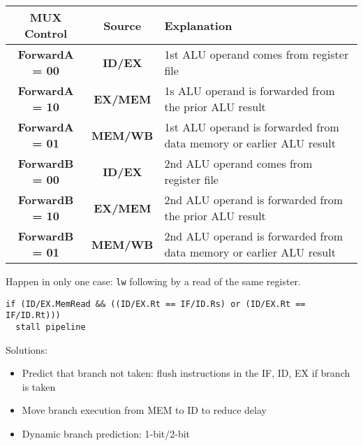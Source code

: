 \begin{multicols}{2}
\begin{tabular}{|c|c|p{8cm}|}
\hline
\textbf{MUX Control}   & \textbf{Source} & \textbf{Explanation}                                                \\ \hline
\textbf{ForwardA = 00} & \textbf{ID/EX}  & 1st ALU operand comes from register file                            \\ \hline
\textbf{ForwardA = 10} & \textbf{EX/MEM} & 1s ALU operand is forwarded from the prior ALU result               \\ \hline
\textbf{ForwardA = 01} & \textbf{MEM/WB} & 1st ALU operand is forwarded from data memory or earlier ALU result \\ \hline
\textbf{ForwardB = 00} & \textbf{ID/EX}  & 2nd ALU operand comes from register file                            \\ \hline
\textbf{ForwardB = 10} & \textbf{EX/MEM} & 2nd ALU operand is forwarded from the prior ALU result              \\ \hline
\textbf{ForwardB = 01} & \textbf{MEM/WB} & 2nd ALU operand is forwarded from data memory or earlier ALU result \\ \hline
\end{tabular}

      \par Happen in only one case: \lstinline{lw} following by a read of the
        same register.
\begin{lstlisting}
if (ID/EX.MemRead && ((ID/EX.Rt == IF/ID.Rs) or (ID/EX.Rt == IF/ID.Rt)))
  stall pipeline
\end{lstlisting}

    \par Solutions:
      \begin{itemize}
        \item Predict that branch not taken: flush instructions in the IF, ID,
          EX if branch is taken
        \item Move branch execution from MEM to ID to reduce delay
        \item Dynamic branch prediction: 1-bit/2-bit
      \end{itemize}
\end{multicols}


